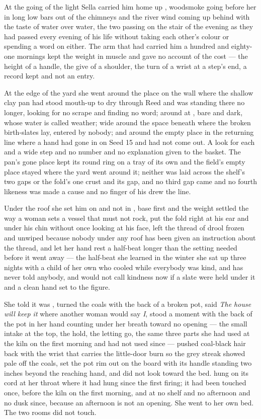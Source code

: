 At the going of the light Sella carried him home up , woodsmoke going before her in long low bars out of the chimneys and the river wind coming up behind with the taste of water over water, the two passing on the stair of the evening as they had passed every evening of his life without taking each other's colour or spending a word on either. The arm that had carried him a hundred and eighty-one mornings kept the weight in muscle and gave no account of the cost --- the height of a handle, the give of a shoulder, the turn of a wrist at a step's end, a record kept and not an entry.

At the edge of the yard she went around the place on the wall where the shallow clay pan had stood mouth-up to dry through Reed and was standing there no longer, looking for no scrape and finding no word; around  at , bare and dark, whose water is called weather; wide around the space beneath  where the broken birth-slates lay, entered by nobody; and around the empty place in the returning line where a hand had gone in on Seed 15 and had not come out. A look for each and a wide step and no number and no explanation given to the basket. The pan's gone place kept its round ring on a tray of its own and the field's empty place stayed where the yard went around it; neither was laid across the shelf's two gaps or the fold's one crust and its gap, and no third gap came and no fourth likeness was made a cause and no finger of his drew the line.

Under the roof she set him on  and not in , base first and the weight settled the way a woman sets a vessel that must not rock, put the fold right at his ear and under his chin without once looking at his face, left the thread of drool frozen and unwiped because nobody under any roof has been given an instruction about the thread, and let her hand rest a half-beat longer than the setting needed before it went away --- the half-beat she learned in the winter she sat up three nights with a child of her own who cooled while everybody was kind, and has never told anybody, and would not call kindness now if a slate were held under it and a clean hand set to the figure.

She told  it was , turned the coals with the back of a broken pot, said \emph{The house will keep it} where another woman would say \emph{I}, stood a moment with the back of the pot in her hand counting under her breath toward no opening --- the small intake at the top, the hold, the letting go, the same three parts she had used at the kiln on the first morning and had not used since --- pushed coal-black hair back with the wrist that carries the little-door burn so the grey streak showed pale off the coals, set the pot rim out on the board with its handle standing two inches beyond the reaching hand, and did not look toward the bed.  hung on its cord at her throat where it had hung since the first firing; it had been touched once, before the kiln on the first morning, and at no shelf and no afternoon and no dusk since, because an afternoon is not an opening. She went to her own bed. The two rooms did not touch.

